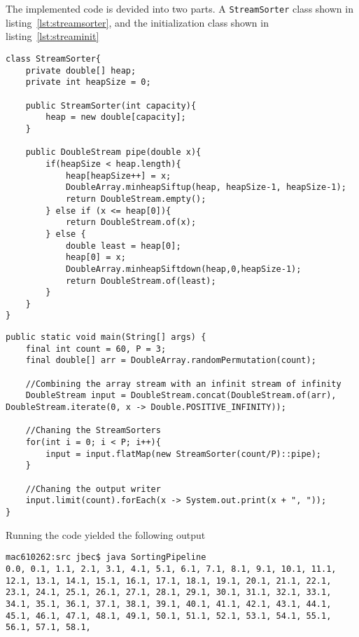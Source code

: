 \documentclass{ituhandin}
\begin{document}
\chapter{} %
\section{}

The implemented code is devided into two parts. A \texttt{StreamSorter} class shown in listing~\ref{lst:streamsorter}, and the initialization class shown in listing~\ref{lst:streaminit}

\begin{lstlisting}[caption=\texttt{StreamSorter} class, label={lst:streamsorter}]
class StreamSorter{
    private double[] heap;
    private int heapSize = 0;

    public StreamSorter(int capacity){
        heap = new double[capacity];
    }

    public DoubleStream pipe(double x){
        if(heapSize < heap.length){
            heap[heapSize++] = x;
            DoubleArray.minheapSiftup(heap, heapSize-1, heapSize-1);
            return DoubleStream.empty();
        } else if (x <= heap[0]){
            return DoubleStream.of(x);
        } else {
            double least = heap[0];
            heap[0] = x;
            DoubleArray.minheapSiftdown(heap,0,heapSize-1);
            return DoubleStream.of(least);
        }
    }
}
\end{lstlisting}
\begin{lstlisting}[caption=Starting method for the \texttt{StreamSorter}, label={lst:streaminit}]
public static void main(String[] args) {
    final int count = 60, P = 3;
    final double[] arr = DoubleArray.randomPermutation(count);

    //Combining the array stream with an infinit stream of infinity
    DoubleStream input = DoubleStream.concat(DoubleStream.of(arr), DoubleStream.iterate(0, x -> Double.POSITIVE_INFINITY));

    //Chaning the StreamSorters
    for(int i = 0; i < P; i++){
        input = input.flatMap(new StreamSorter(count/P)::pipe);
    }

    //Chaning the output writer
    input.limit(count).forEach(x -> System.out.print(x + ", "));
}
\end{lstlisting}

Running the code yielded the following output

\begin{lstlisting}[language={},frame={}]
mac610262:src jbec$ java SortingPipeline
0.0, 0.1, 1.1, 2.1, 3.1, 4.1, 5.1, 6.1, 7.1, 8.1, 9.1, 10.1, 11.1, 12.1, 13.1, 14.1, 15.1, 16.1, 17.1, 18.1, 19.1, 20.1, 21.1, 22.1, 23.1, 24.1, 25.1, 26.1, 27.1, 28.1, 29.1, 30.1, 31.1, 32.1, 33.1, 34.1, 35.1, 36.1, 37.1, 38.1, 39.1, 40.1, 41.1, 42.1, 43.1, 44.1, 45.1, 46.1, 47.1, 48.1, 49.1, 50.1, 51.1, 52.1, 53.1, 54.1, 55.1, 56.1, 57.1, 58.1,
\end{lstlisting}
\end{document}
